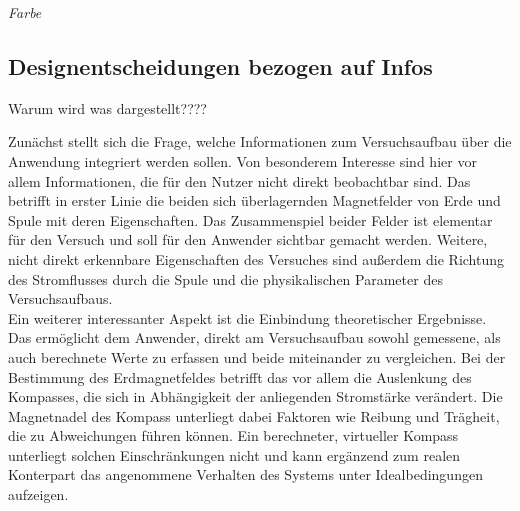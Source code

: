 \textit{Farbe}

\subsection{Designentscheidungen bezogen auf Infos}
Warum wird was dargestellt????

Zunächst stellt sich die Frage, welche Informationen zum Versuchsaufbau über die Anwendung integriert werden sollen. Von besonderem Interesse sind hier vor allem Informationen, die für den Nutzer nicht direkt beobachtbar sind. Das betrifft in erster Linie die beiden sich überlagernden Magnetfelder von Erde und Spule mit deren Eigenschaften. Das Zusammenspiel beider Felder ist elementar für den Versuch und soll für den Anwender sichtbar gemacht werden. Weitere, nicht direkt erkennbare Eigenschaften des Versuches sind außerdem die Richtung des Stromflusses durch die Spule und die physikalischen Parameter des Versuchsaufbaus.\\

Ein weiterer interessanter Aspekt ist die Einbindung theoretischer Ergebnisse. Das ermöglicht dem Anwender, direkt am Versuchsaufbau sowohl gemessene, als auch berechnete Werte zu erfassen und beide miteinander zu vergleichen. Bei der Bestimmung des Erdmagnetfeldes betrifft das vor allem die Auslenkung des Kompasses, die sich in Abhängigkeit der anliegenden Stromstärke verändert. Die Magnetnadel des Kompass unterliegt dabei Faktoren wie Reibung und Trägheit, die zu Abweichungen führen können. Ein berechneter, virtueller Kompass unterliegt solchen Einschränkungen nicht und kann ergänzend zum realen Konterpart das angenommene Verhalten des Systems unter Idealbedingungen aufzeigen.\\

